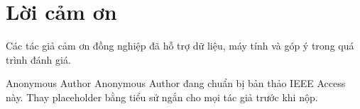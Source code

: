 \documentclass{ieeeaccess}
\begin{document}
\section*{Lời cảm ơn}
Các tác giả cảm ơn đồng nghiệp đã hỗ trợ dữ liệu, máy tính và góp ý trong quá trình đánh giá.




\begin{IEEEbiographynophoto}{Anonymous Author}
Anonymous Author đang chuẩn bị bản thảo IEEE Access này.
Thay placeholder bằng tiểu sử ngắn cho mọi tác giả trước khi nộp.
\end{IEEEbiographynophoto}

\EOD
\end{document}
